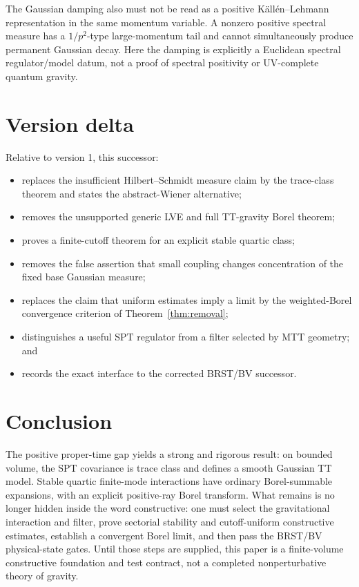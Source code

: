 \documentclass[11pt]{article}
\begin{document}
The Gaussian damping also must not be read as a positive K\"all\'en--Lehmann
representation in the same momentum variable. A nonzero positive spectral measure
has a $1/p^2$-type large-momentum tail and cannot simultaneously produce permanent
Gaussian decay. Here the damping is explicitly a Euclidean spectral regulator/model
datum, not a proof of spectral positivity or UV-complete quantum gravity.

\section{Version delta}

Relative to version 1, this successor:
\begin{itemize}
\item replaces the insufficient Hilbert--Schmidt measure claim by the trace-class
theorem and states the abstract-Wiener alternative;
\item removes the unsupported generic LVE and full TT-gravity Borel theorem;
\item proves a finite-cutoff theorem for an explicit stable quartic class;
\item removes the false assertion that small coupling changes concentration of the
fixed base Gaussian measure;
\item replaces the claim that uniform estimates imply a limit by the weighted-Borel
convergence criterion of Theorem~\ref{thm:removal};
\item distinguishes a useful SPT regulator from a filter selected by MTT geometry;
and
\item records the exact interface to the corrected BRST/BV successor.
\end{itemize}

\section{Conclusion}

The positive proper-time gap yields a strong and rigorous result: on bounded volume,
the SPT covariance is trace class and defines a smooth Gaussian TT model. Stable
quartic finite-mode interactions have ordinary Borel-summable expansions, with an
explicit positive-ray Borel transform. What remains is no longer hidden inside the
word constructive: one must select the gravitational interaction and filter,
prove sectorial stability and cutoff-uniform constructive estimates, establish a
convergent Borel limit, and then pass the BRST/BV physical-state gates. Until those
steps are supplied, this paper is a finite-volume constructive foundation and test
contract, not a completed nonperturbative theory of gravity.
\end{document}
